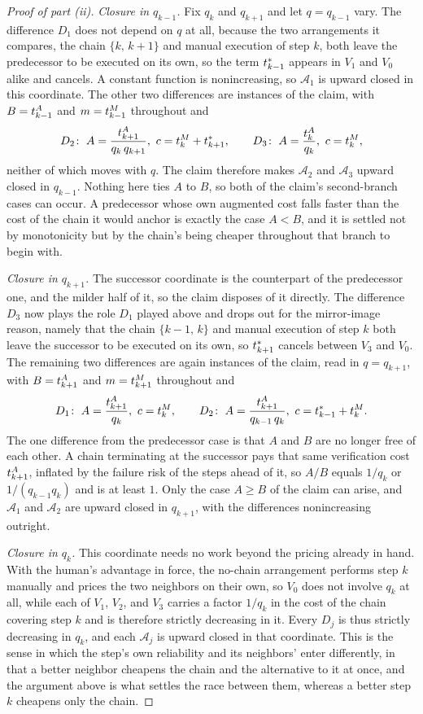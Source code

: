 \begin{proof}[Proof of part (ii)]
\emph{Closure in $q_{k-1}$.}
Fix $q_k$ and $q_{k+1}$ and let $q = q_{k-1}$ vary.
The difference $D_1$ does not depend on $q$ at all, because the two arrangements it compares, the chain $\{k,\, k+1\}$ and manual execution of step $k$, both leave the predecessor to be executed on its own, so the term $t^*_{k-1}$ appears in $V_1$ and $V_0$ alike and cancels.
A constant function is nonincreasing, so $\mathcal{A}_1$ is upward closed in this coordinate.
The other two differences are instances of the claim, with $B = t^{A}_{k-1}$ and $m = t^{M}_{k-1}$ throughout and
\[
D_2\!: \ A = \frac{t^{A}_{k+1}}{q_k\, q_{k+1}}, \ c = t^{M}_{k} + t^*_{k+1}, \qquad
D_3\!: \ A = \frac{t^{A}_{k}}{q_k}, \ c = t^{M}_{k},
\]
neither of which moves with $q$.
The claim therefore makes $\mathcal{A}_2$ and $\mathcal{A}_3$ upward closed in $q_{k-1}$.
Nothing here ties $A$ to $B$, so both of the claim's second-branch cases can occur.
A predecessor whose own augmented cost falls faster than the cost of the chain it would anchor is exactly the case $A < B$, and it is settled not by monotonicity but by the chain's being cheaper throughout that branch to begin with.

\emph{Closure in $q_{k+1}$.}
The successor coordinate is the counterpart of the predecessor one, and the milder half of it, so the claim disposes of it directly.
The difference $D_3$ now plays the role $D_1$ played above and drops out for the mirror-image reason, namely that the chain $\{k-1,\, k\}$ and manual execution of step $k$ both leave the successor to be executed on its own, so $t^*_{k+1}$ cancels between $V_3$ and $V_0$.
The remaining two differences are again instances of the claim, read in $q = q_{k+1}$, with $B = t^{A}_{k+1}$ and $m = t^{M}_{k+1}$ throughout and
\[
D_1\!: \ A = \frac{t^{A}_{k+1}}{q_k}, \ c = t^{M}_{k}, \qquad
D_2\!: \ A = \frac{t^{A}_{k+1}}{q_{k-1}\, q_k}, \ c = t^*_{k-1} + t^{M}_{k}.
\]
The one difference from the predecessor case is that $A$ and $B$ are no longer free of each other.
A chain terminating at the successor pays that same verification cost $t^{A}_{k+1}$, inflated by the failure risk of the steps ahead of it, so $A/B$ equals $1/q_k$ or $1/(q_{k-1} q_k)$ and is at least $1$.
Only the case $A \geq B$ of the claim can arise, and $\mathcal{A}_1$ and $\mathcal{A}_2$ are upward closed in $q_{k+1}$, with the differences nonincreasing outright.

\emph{Closure in $q_k$.}
This coordinate needs no work beyond the pricing already in hand.
With the human's advantage in force, the no-chain arrangement performs step $k$ manually and prices the two neighbors on their own, so $V_0$ does not involve $q_k$ at all, while each of $V_1$, $V_2$, and $V_3$ carries a factor $1/q_k$ in the cost of the chain covering step $k$ and is therefore strictly decreasing in it.
Every $D_j$ is thus strictly decreasing in $q_k$, and each $\mathcal{A}_j$ is upward closed in that coordinate.
This is the sense in which the step's own reliability and its neighbors' enter differently, in that a better neighbor cheapens the chain and the alternative to it at once, and the argument above is what settles the race between them, whereas a better step $k$ cheapens only the chain.


\end{proof}
